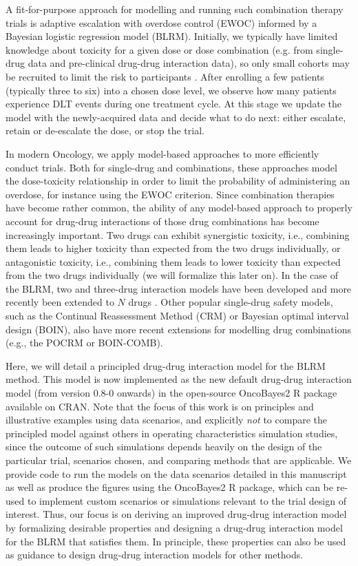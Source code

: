 \documentclass[AMA,STIX1COL]{WileyNJD-v2}
\begin{document}
A fit-for-purpose approach for modelling and running such combination therapy trials is adaptive escalation with overdose control (EWOC) informed by a Bayesian logistic regression model (BLRM)\cite{Neuenschwander2014}. Initially, we typically have limited knowledge about toxicity for a given dose or dose combination (e.g. from single-drug data and pre-clinical drug-drug interaction data), so only small cohorts may be recruited to limit the risk to participants \cite{Babb1998}. After enrolling a few patients (typically three to six) into a chosen dose level, we observe how many patients experience DLT events during one treatment cycle. At this stage we update the model with the newly-acquired data and decide what to do next: either escalate, retain or de-escalate the dose, or stop the trial. 

In modern Oncology, we apply model-based approaches to more efficiently conduct trials. Both for single-drug and combinations, these approaches model the dose-toxicity relationship in order to limit the probability of administering an overdose, for instance using the EWOC criterion. Since combination therapies have become rather common, the ability of any model-based approach to properly account for drug-drug interactions of those drug combinations has become increasingly important. Two drugs can exhibit synergistic toxicity, i.e., combining them leads to higher toxicity than expected from the two drugs individually, or antagonistic toxicity, i.e., combining them leads to lower toxicity than expected from the two drugs individually (we will formalize this later on). In the case of the BLRM, two and three-drug interaction models have been developed \cite{Neuenschwander2014} and more recently been extended to $N$ drugs \cite{OncoBayes2}. Other popular single-drug safety models, such as the Continual Reassessment Method (CRM)\cite{Quigley1990} or Bayesian optimal interval design (BOIN)\cite{Yuan2016}, also have more recent extensions for modelling drug combinations (e.g., the POCRM\cite{Wages2011} or BOIN-COMB\cite{Zhang2016, Lin2017}).

Here, we will detail a principled drug-drug interaction model for the BLRM method. This model is now implemented as the new default drug-drug interaction model (from version 0.8-0 onwards) in the open-source OncoBayes2\cite{OncoBayes2} R package available on CRAN. Note that the focus of this work is on principles and illustrative examples using data scenarios, and explicitly \emph{not} to compare the principled model against others in operating characteristics simulation studies, since the outcome of such simulations depends heavily on the design of the particular trial, scenarios chosen, and comparing methods that are applicable. We provide code to run the models on the data scenarios detailed in this manuscript as well as produce the figures using the OncoBayes2 R package, which can be re-used to implement custom scenarios or simulations relevant to the trial design of interest. Thus, our focus is on deriving an improved drug-drug interaction model by formalizing desirable properties and designing a drug-drug interaction model for the BLRM that satisfies them. In principle, these properties can also be used as guidance to design drug-drug interaction models for other methods.
\end{document}
